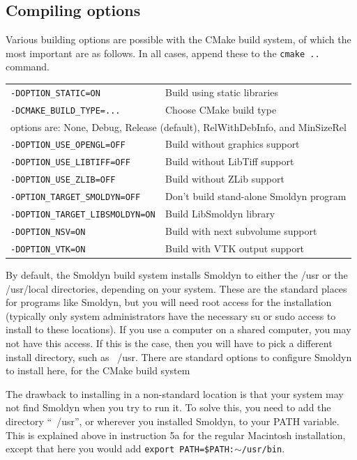 \documentclass {book}
\newcommand {\ttt} {\texttt}
\begin{document}
\subsection*{Compiling options}

Various building options are possible with the CMake build system, of which the most important are as follows. In all cases, append these to the \ttt{cmake ..} command.

\begin{longtable}[c]{ll}
\ttt{-DOPTION\_STATIC=ON} & Build using static libraries\\
\ttt{-DCMAKE\_BUILD\_TYPE=...} & Choose CMake build type\\
\multicolumn{2}{l}{options are: None, Debug, Release (default), RelWithDebInfo, and MinSizeRel}\\
\ttt{-DOPTION\_USE\_OPENGL=OFF} & Build without graphics support\\
\ttt{-DOPTION\_USE\_LIBTIFF=OFF} & Build without LibTiff support\\
\ttt{-DOPTION\_USE\_ZLIB=OFF} & Build without ZLib support\\
\ttt{-OPTION\_TARGET\_SMOLDYN=OFF} & Don't build stand-alone Smoldyn program\\
\ttt{-DOPTION\_TARGET\_LIBSMOLDYN=ON} & Build LibSmoldyn library\\
\ttt{-DOPTION\_NSV=ON} & Build with next subvolume support\\
\ttt{-DOPTION\_VTK=ON} & Build with VTK output support\\
\end{longtable}

By default, the Smoldyn build system installs Smoldyn to either the /usr or the /usr/local directories, depending on your system. These are the standard places for programs like Smoldyn, but you will need root access for the installation (typically only system administrators have the necessary su or sudo access to install to these locations). If you use a computer on a shared computer, you may not have this access. If this is the case, then you will have to pick a different install directory, such as ~/usr. There are standard options to configure Smoldyn to install here, for the CMake build system

The drawback to installing in a non-standard location is that your system may not find Smoldyn when you try to run it. To solve this, you need to add the directory ``~/usr'', or wherever you installed Smoldyn, to your PATH variable. This is explained above in instruction 5a for the regular Macintosh installation, except that here you would add \ttt{export PATH=\$PATH:$\sim$/usr/bin}.
\end{document}
